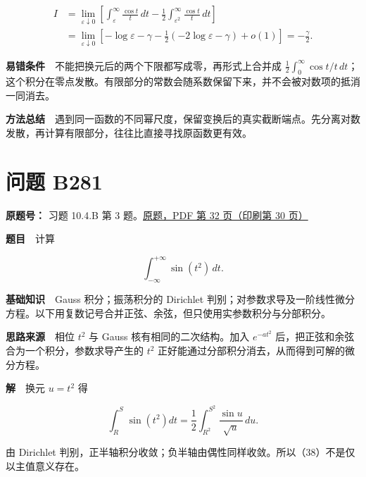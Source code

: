 \documentclass[11pt,a4paper]{article}
\begin{document}
\begin{equation}
\begin{aligned}
I&=\lim_{\varepsilon\downarrow0}\left[
\int_\varepsilon^\infty\frac{\cos t}t\,dt
-\frac12\int_{\varepsilon^2}^\infty\frac{\cos t}t\,dt\right]\\
&=\lim_{\varepsilon\downarrow0}
\left[-\log\varepsilon-\gamma
-\frac12(-2\log\varepsilon-\gamma)+o(1)\right]
=-\frac\gamma2.
\end{aligned}
\tag{37}
\end{equation}

\textbf{易错条件}　不能把换元后的两个下限都写成零，再形式上合并成
\(\frac12\int_0^\infty\cos t/t\,dt\)；这个积分在零点发散。有限部分的常数会随系数保留下来，并不会被对数项的抵消一同消去。

\textbf{方法总结}　遇到同一函数的不同幂尺度，保留变换后的真实截断端点。先分离对数发散，再计算有限部分，往往比直接寻找原函数更有效。

\section{问题 B281}\label{ux95eeux9898-b281}

\textbf{原题号：} 习题 10.4.B 第 3
题。\href{https://zj139.github.io/math-notes/files/problems/楼分析习题-v2.pdf\#page=32}{原题，PDF
第 32 页（印刷第 30 页）}

\textbf{题目}　计算

\begin{equation}
\int_{-\infty}^{+\infty}\sin(t^2)\,dt.
\tag{38}
\end{equation}

\textbf{基础知识}　Gauss 积分；振荡积分的 Dirichlet
判别；对参数求导及一阶线性微分方程。以下用复数记号合并正弦、余弦，但只使用实参数积分与分部积分。

\textbf{思路来源}　相位 \(t^2\) 与 Gauss 核有相同的二次结构。加入
\(e^{-at^2}\) 后，把正弦和余弦合为一个积分，参数求导产生的 \(t^2\)
正好能通过分部积分消去，从而得到可解的微分方程。

\textbf{解}　换元 \(u=t^2\) 得

\begin{equation}
\int_R^S\sin(t^2)dt
=\frac12\int_{R^2}^{S^2}\frac{\sin u}{\sqrt u}\,du.
\tag{39}
\end{equation}

由 Dirichlet
判别，正半轴积分收敛；负半轴由偶性同样收敛。所以（38）不是仅以主值意义存在。
\end{document}

